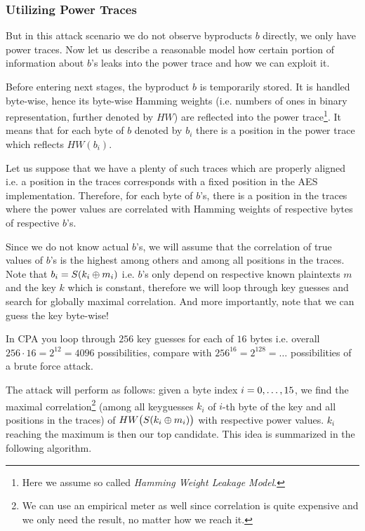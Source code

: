 \subsubsection{Utilizing Power Traces}

But in this attack scenario we do not observe byproducts $b$ directly, we only have power traces. Now let us describe a reasonable model how certain portion of information about $b$'s leaks into the power trace and how we can exploit it.

Before entering next stages, the byproduct $b$ is temporarily stored. It is handled byte-wise, hence its byte-wise Hamming weights (i.e. numbers of ones in binary representation, further denoted by $HW$) are reflected into the power trace\footnote{Here we assume so called {\em Hamming Weight Leakage Model}.}. It means that for each byte of $b$ denoted by $b_i$ there is a position in the power trace which reflects $HW(b_i)$.

Let us suppose that we have a plenty of such traces which are properly aligned i.e. a position in the traces corresponds with a fixed position in the AES implementation. Therefore, for each byte of $b$'s, there is a position in the traces where the power values are correlated with Hamming weights of respective bytes of respective $b$'s.

Since we do not know actual $b$'s, we will assume that the correlation of true values of $b$'s is the highest among others and among all positions in the traces. Note that $b_i = S(k_i\oplus m_i)$ i.e. $b$'s only depend on respective known plaintexts $m$ and the key $k$ which is constant, therefore we will loop through key guesses and search for globally maximal correlation. And more importantly, note that we can guess the key byte-wise!

\begin{note}
\label{note:brutevssca}
	In CPA you loop through $256$ key guesses for each of $16$ bytes i.e. overall $256\cdot 16 = 2^{12} = 4096$ possibilities, compare with $256^{16} = 2^{128} = \ldots$ possibilities of a brute force attack.
\end{note}

The attack will perform as follows: given a byte index $i=0 , \ldots , 15$, we find the maximal correlation\footnote{We can use an empirical meter as well since correlation is quite expensive and we only need the result, no matter how we reach it.} (among all keyguesses $k_i$ of $i$-th byte of the key and all positions in the traces) of $HW\bigl(S(k_i\oplus m_i)\bigr)$ with respective power values. $k_i$ reaching the maximum is then our top candidate. This idea is summarized in the following algorithm.

